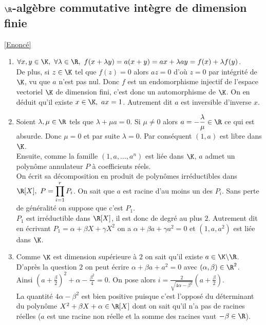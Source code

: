 \documentclass[8pt]{book}
\begin{document}
	\subsection{$\R$-algèbre commutative intègre de dimension finie }
	\label{R algèbre commutative intègre de dimension finie corrigé}
	\textcolor{blue}{\hyperref[R algèbre commutative intègre de dimension finie]{[Enoncé]}}\\
	\begin{enumerate}[leftmargin=*]
		\item $\forall x,y\in \K,\ \forall \lambda\in \R,\ f(x+\lambda y)=a(x+y)=ax+\lambda ay=f(x)+\lambda f(y)$.\\
		De plus, si $z\in \K$ tel que $f(z)=0$ alors $az=0$ d'où $z=0$ par intégrité de $\K$, vu que $a$ n'est pas nul. Donc $f$ est un endomorphisme injectif de l'espace vectoriel $\K$ de dimension fini, c'est donc un automorphisme de $\K$. On en déduit qu'il existe $x\in \K,\ ax=1$. Autrement dit $a$ est inversible d'inverse $x$.
		\item Soient $\lambda,\mu\in \R$ tels que $\lambda+\mu a=0$. Si $\mu\ne 0$ alors $a=-\displaystyle\frac{\lambda}{\mu}\in \R$ ce qui est absurde. Donc $\mu=0$ et par suite $\lambda=0$. Par conséquent $(1,a)$ est libre dans $\K$.\\
		Ensuite, comme la famille $(1,a,\dots,a^n)$ est liée dans $\K$, $a$ admet un polynôme annulateur $P$ à coefficients réels.\\
		On écrit sa décomposition en produit de polynômes irréductibles dans $\R[X],\ P=\displaystyle\prod_{i=1}^rP_i$. On sait que $a$ est racine d'au moins un des $P_i$. Sans perte de généralité on suppose que c'est $P_1$.\\
		$P_1$ est irréductible dans $\R[X]$, il est donc de degré au plus $2$. Autrement dit en écrivant $P_1=\alpha+\beta X+\gamma X^2$ on a $\alpha+\beta a+\gamma a^2=0$ et $(1,a,a^2)$ est liée dans $\K$.
		\item Comme $\K$ est dimension supérieure à $2$ on sait qu'il existe $a\in \K\backslash \R$. D'après la question $2$ on peut écrire $\alpha +\beta a+a^2=0$ avec $(\alpha,\beta)\in \R^2$.\\
		Ainsi $\displaystyle\left(a+\frac{\beta}{2}\right)^2+\alpha-\frac{\beta^2}{4}=0$. On pose alors $i=\displaystyle\frac{2}{\sqrt{4\alpha-\beta^2}}\left(a+\frac{\beta}{2}\right)$.\\
		La quantité $4\alpha-\beta^2$ est bien positive puisque c'est l'opposé du déterminant du polynôme $X^2+\beta X+\alpha\in \R[X]$ dont on sait qu'il n'a pas de racines réelles ($a$ est une racine non réelle et la somme des racines vaut $-\beta\in \R$).\\

\end{enumerate}
\end{document}

